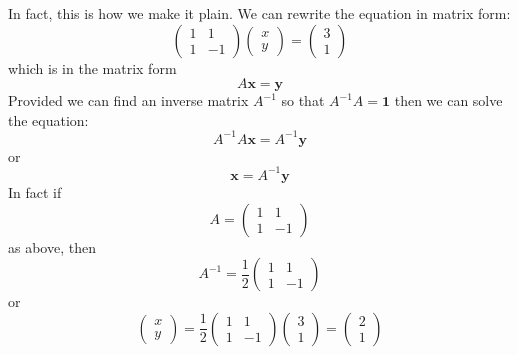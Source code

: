 \documentclass[12pt]{article}
\begin{document}
In fact, this is how we make it plain. We can rewrite the equation in
matrix form:
\begin{equation}
\begin{pmatrix}
1 & 1 \\
1 & -1
\end{pmatrix}
\begin{pmatrix}
x \\ y
\end{pmatrix}
=
\begin{pmatrix}
3 \\ 1
\end{pmatrix}
\end{equation}
which is in the matrix form
\begin{equation}
  A\mathbf{x}=\mathbf{y}
\end{equation}
Provided we can find an inverse matrix $A^{-1}$ so that $A^{-1}A=\mathbf{1}$ then we can solve the equation:
\begin{equation}
  A^{-1}A\mathbf{x}=A^{-1}\mathbf{y}
\end{equation}
or
\begin{equation}
 \mathbf{x}=A^{-1}\mathbf{y}
\end{equation}
In fact if
\begin{equation}
  A=\begin{pmatrix}
1 & 1 \\
1 & -1
  \end{pmatrix}
\end{equation}
as above, then
\begin{equation}
  A^{-1}
  =
\frac12
\begin{pmatrix}
1 & 1 \\
1 & -1
\end{pmatrix}
\end{equation}
or
\begin{equation}
\begin{pmatrix}
x \\ y
\end{pmatrix}
=
\frac12
\begin{pmatrix}
1 & 1 \\
1 & -1
\end{pmatrix}
\begin{pmatrix}
3 \\ 1
\end{pmatrix}
=
\begin{pmatrix}
2 \\ 1
\end{pmatrix}
\end{equation}
\end{document}
